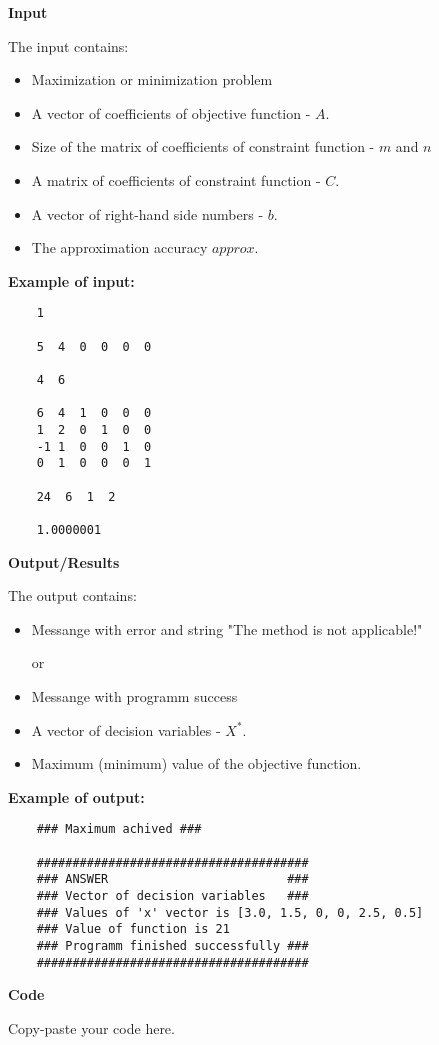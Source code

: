 \documentclass[12pt, legalpaper]{exam}
\begin{document}
\noindent     \textbf{Input}

\vspace{12pt}
The input contains:
\begin{itemize}
    \item Maximization or minimization problem
    \item A vector of coefficients of objective function - $A$.
    \item Size of the matrix of coefficients of constraint function - $m$ and $n$
    \item A matrix of coefficients of constraint function - $C$.
    \item A vector of right-hand side numbers - $b$.
    \item The approximation accuracy $approx$.
\end{itemize}

\vspace{12pt}
\textbf{Example of input:}
\begin{verbatim}
    1 
    
    5  4  0  0  0  0

    4  6

    6  4  1  0  0  0 
    1  2  0  1  0  0
    -1 1  0  0  1  0
    0  1  0  0  0  1

    24  6  1  2

    1.0000001
\end{verbatim}

\vspace{12pt}
\noindent     \textbf{Output/Results}

The output contains:
\begin{itemize}
    \item Messange with error and string "The method is not applicable!"
    
or
    \item Messange with programm success
    \item A vector of decision variables - $X^*$.
    \item Maximum (minimum) value of the objective function.
\end{itemize}

\vspace{12pt}
\textbf{Example of output:}

\begin{verbatim}
    ### Maximum achived ###

    ######################################
    ### ANSWER                         ###
    ### Vector of decision variables   ###
    ### Values of 'x' vector is [3.0, 1.5, 0, 0, 2.5, 0.5]
    ### Value of function is 21
    ### Programm finished successfully ###
    ######################################
\end{verbatim}

\noindent
{}




\vspace{24pt}
\noindent     \textbf{Code}

Copy-paste your code here.
\end{document}
